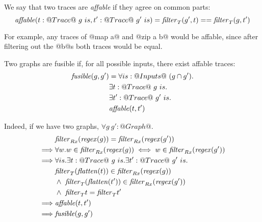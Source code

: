 We say that two traces are \emph{affable} if they agree on common parts:
\[ \mathit{affable}(t : @Trace@~g~is, t' : @Trace@~g'~is) = \mathit{filter}_{T}(g', t) == \mathit{filter}_{T}(g, t') \]

For example, any traces of @map a@ and @zip a b@ would be affable, since after filtering out the @b@s both traces would be equal.

Two graphs are fusible if, for all possible inputs, there exist affable traces:
\begin{align*}
\mathit{fusible}(g, g')
        &=  \forall is : @Inputs@~(g \cap g').  \\
        &   \exists t  : @Trace@~g~is.          \\
        &   \exists t' : @Trace@~g'~is.         \\
        &   \affable(t, t')                     %
\end{align*}


Indeed, if we have two graphs, $\forall g~g' : @Graph@.$
\begin{eqnarray*}
 & \mathit{filter}_{Rx}(\mathit{regex}(g)) = \mathit{filter}_{Rx}(\mathit{regex}(g')) \\
 \implies & \forall w. w \in \mathit{filter}_{Rx}(\mathit{regex}(g)) \iff w \in \mathit{filter}_{Rx}(\mathit{regex}(g')) \\
 \implies & \forall is. \exists t : @Trace@~g~is. \exists t' : @Trace@~g'~is. \\
          & \mathit{filter}_{T}(\mathit{flatten}(t)) \in \mathit{filter}_{Rx}(\mathit{regex}(g)) \\
          & \wedge~\mathit{filter}_{T}(\mathit{flatten}(t')) \in \mathit{filter}_{Rx}(\mathit{regex}(g')) \\
          & \wedge~\mathit{filter}_{T} t = \mathit{filter}_{T} t' \\
 \implies & \mathit{affable}(t, t') \\
 \implies & \mathit{fusible}(g, g') \\
\end{eqnarray*}

